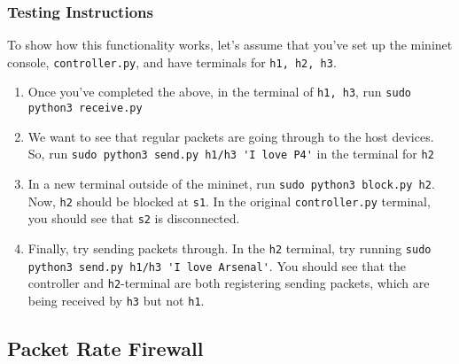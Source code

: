 \subsubsection{Testing Instructions}
To show how this functionality works, let's assume that you've set up the mininet console, \verb|controller.py|, and have terminals for \verb|h1, h2, h3|. 
\begin{enumerate}
    \item Once you've completed the above, in the terminal of \verb|h1, h3|, run \verb|sudo python3 receive.py|
    \item We want to see that regular packets are going through to the host devices. So, run \verb|sudo python3 send.py h1/h3 'I love P4'| in the terminal for \verb|h2|
    \item In a new terminal outside of the mininet, run \verb|sudo python3 block.py h2|. Now, \verb|h2| should be blocked at \verb|s1|. In the original \verb|controller.py| terminal, you should see that \verb|s2| is disconnected.
    \item Finally, try sending packets through. In the \verb|h2| terminal, try running \verb|sudo python3 send.py h1/h3 'I love Arsenal'|. You should see that the controller and \verb|h2|-terminal are both registering sending packets, which are being received by \verb|h3| but not \verb|h1|.
\end{enumerate}
\subsection{Packet Rate Firewall}
